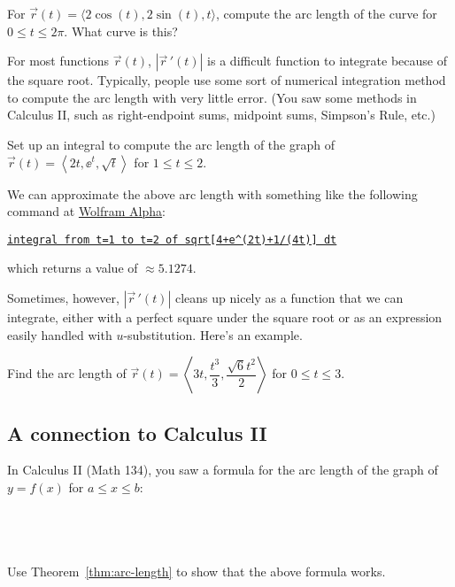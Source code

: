 \begin{ex}
    For $\vec{r}(t)=\langle 2\cos(t),2\sin(t),t\rangle$, compute the arc length of the curve for $0\le t\le 2\pi$. What curve is this?
\end{ex}

\vfill

\pagebreak 

For most functions $\vec{r}(t)$, $|\vec{r}\,'(t)|$ is a difficult function to integrate because of the square root. Typically, people use some sort of numerical integration method to compute the arc length with very little error. (You saw some methods in Calculus II, such as right-endpoint sums, midpoint sums, Simpson's Rule, etc.)
\begin{ex}
    Set up an integral to compute the arc length of the graph of $\vec{r}(t)=\left\langle 2t,\ee^t, \sqrt{t}\right\rangle$ for $1\le t\le 2$.
\end{ex}

\vfill

We can approximate the above arc length with something like the following command at \href{https://www.wolframalpha.com}{Wolfram Alpha}:
\begin{center}
    \href{https://www.wolframalpha.com/input/?i=integral+from+t%3D1+to+t%3D2+of+sqrt%5B4+%2B+e%5E%282t%29+%2B+1%2F%284t%29%5D+dt}
    {\tt{integral from t=1 to t=2 of sqrt[4+e\string^(2t)+1/(4t)] dt}}
\end{center}
which returns a value of $\approx 5.1274$.

Sometimes, however, $|\vec{r}\,'(t)|$ cleans up nicely as a function that we can integrate, either with a perfect square under the square root or as an expression easily handled with $u$-substitution. Here's an example.

\begin{ex}
    Find the arc length of $\vec{r}(t)=\left\langle 3t,\dfrac{t^3}{3},\dfrac{\sqrt{6}t^2}{2}\right\rangle$ for $0\le t\le 3$.
\end{ex}

\vfill

\pagebreak 

\subsection{A connection to Calculus II}
In Calculus II (Math 134), you saw a formula for the arc length of the graph of $y=f(x)$ for $a\le x\le b$:
\[
    \phantom{\text{arc length } = \int\limits_a^b\sqrt{1+(f'(x))^2}\dx.}
\]

\vspace{1in}

\begin{ex}
    Use Theorem~\ref{thm:arc-length} to show that the above formula works.
\end{ex}

\vfill
